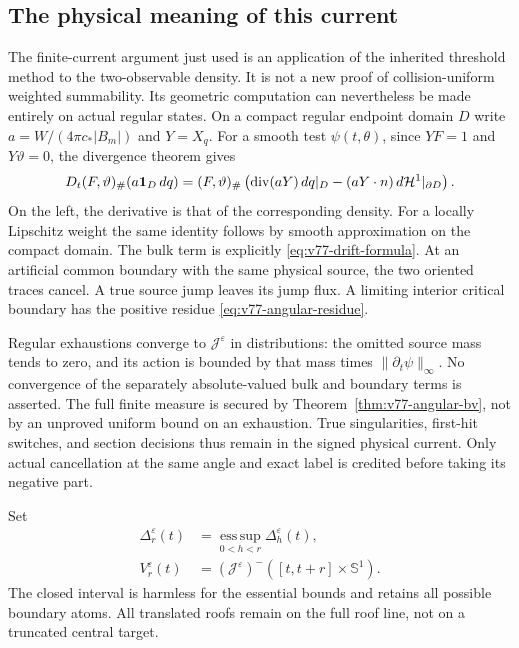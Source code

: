 \subsection{The physical meaning of this current}
The finite-current argument just used is an application of the
inherited threshold method to the two-observable density. It is
not a new proof of collision-uniform weighted summability.
Its geometric computation can nevertheless be made entirely on
actual regular states. On a compact regular endpoint domain $D$
write $a=W/(4\pi c_*|B_m|)$ and $Y=X_q$. For a smooth test
$\psi(t,\theta)$, since $YF=1$ and $Y\vartheta=0$, the divergence
theorem gives
\begin{equation}\label{eq:v77-angular-flux}
 D_t (F,\vartheta)_\#(a\one_D\,dq)
 = (F,\vartheta)_\#\left(
     \operatorname{div}(aY)\,dq|_D
       -(aY\cdot n)\,d\mathcal H^1|_{\partial D}\right).
\end{equation}
On the left, the derivative is that of the corresponding density.
For a locally Lipschitz weight the same identity follows by smooth
approximation on the compact domain. The bulk term is explicitly
\eqref{eq:v77-drift-formula}. At an artificial common boundary with
the same physical source, the two oriented traces cancel. A true
source jump leaves its jump flux. A limiting interior critical
boundary has the positive residue \eqref{eq:v77-angular-residue}.

Regular exhaustions converge to $\mathscr J^\varepsilon$ in
distributions: the omitted source mass tends to zero, and its action
is bounded by that mass times $\|\partial_t\psi\|_\infty$.
No convergence of the separately absolute-valued bulk and boundary
terms is asserted. The full finite measure is secured by
Theorem~\ref{thm:v77-angular-bv}, not by an unproved uniform bound
on an exhaustion. True singularities, first-hit switches, and
section decisions thus remain in the signed physical current.
Only actual cancellation at the same angle and exact label is
credited before taking its negative part.

Set
\begin{align}
 \Delta_r^\varepsilon(t)&=
       \operatorname*{ess\,sup}_{0<h<r}\Delta_h^\varepsilon(t),
                                      \label{eq:v77-maximal-defect}\\
 V_r^\varepsilon(t)&=(\mathscr J^\varepsilon)^-
                             ([t,t+r]\times\mathbb S^1).
                                      \label{eq:v77-angular-strip}
\end{align}
The closed interval is harmless for the essential bounds and retains
all possible boundary atoms. All translated roofs remain on the
full roof line, not on a truncated central target.

